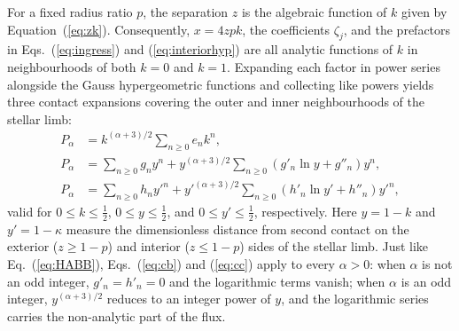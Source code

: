 \documentclass[11pt]{article}
\begin{document}
For a fixed radius ratio $p$, the separation $z$ is the algebraic function of $k$ given by Equation~(\ref{eq:zk}). Consequently, $x=4zpk$, the coefficients $\zeta_j$, and the prefactors in Eqs.~(\ref{eq:ingress}) and (\ref{eq:interiorhyp}) are all analytic functions of $k$ in neighbourhoods of both $k=0$ and $k=1$. Expanding each factor in power series alongside the Gauss hypergeometric functions and collecting like powers yields three contact expansions covering the outer and inner neighbourhoods of the stellar limb:
\begin{align}
P_\alpha&=k^{(\alpha+3)/2}\sum_{n\ge0}e_n k^n, \label{eq:ca}\\
P_\alpha&=\sum_{n\ge0}g_n y^n+y^{(\alpha+3)/2}\sum_{n\ge0}\left(g'_n\ln y+g''_n\right)y^n, \label{eq:cb}\\
P_\alpha&=\sum_{n\ge0}h_n y'^n+y'^{(\alpha+3)/2}\sum_{n\ge0}\left(h'_n\ln y'+h''_n\right)y'^n, \label{eq:cc}
\end{align}
valid for $0\le k\le\tfrac12$, $0\le y\le\tfrac12$, and $0\le y'\le\tfrac12$, respectively. Here $y=1-k$ and $y'=1-\kappa$ measure the dimensionless distance from second contact on the exterior ($z\ge 1-p$) and interior ($z\le 1-p$) sides of the stellar limb. Just like Eq.~(\ref{eq:HABB}), Eqs.~(\ref{eq:cb}) and (\ref{eq:cc}) apply to every $\alpha>0$: when $\alpha$ is not an odd integer, $g'_n=h'_n=0$ and the logarithmic terms vanish; when $\alpha$ is an odd integer, $y^{(\alpha+3)/2}$ reduces to an integer power of $y$, and the logarithmic series carries the non-analytic part of the flux.
\end{document}
